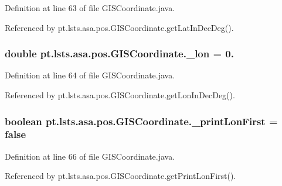 Definition at line 63 of file G\+I\+S\+Coordinate.\+java.



Referenced by pt.\+lsts.\+asa.\+pos.\+G\+I\+S\+Coordinate.\+get\+Lat\+In\+Dec\+Deg().

\hypertarget{classpt_1_1lsts_1_1asa_1_1pos_1_1GISCoordinate_af124301bd53ea68c0b67e9eeb2483c07}{}
\subsubsection[{\+\_\+lon}]{\setlength{\rightskip}{0pt plus 5cm}double pt.\+lsts.\+asa.\+pos.\+G\+I\+S\+Coordinate.\+\_\+lon = 0.\hspace{0.3cm}{\ttfamily [private]}}\label{classpt_1_1lsts_1_1asa_1_1pos_1_1GISCoordinate_af124301bd53ea68c0b67e9eeb2483c07}


Definition at line 64 of file G\+I\+S\+Coordinate.\+java.



Referenced by pt.\+lsts.\+asa.\+pos.\+G\+I\+S\+Coordinate.\+get\+Lon\+In\+Dec\+Deg().

\hypertarget{classpt_1_1lsts_1_1asa_1_1pos_1_1GISCoordinate_af782673ce1b6b2f0031ef307c6488fda}{}
\subsubsection[{\+\_\+print\+Lon\+First}]{\setlength{\rightskip}{0pt plus 5cm}boolean pt.\+lsts.\+asa.\+pos.\+G\+I\+S\+Coordinate.\+\_\+print\+Lon\+First = false\hspace{0.3cm}{\ttfamily [private]}}\label{classpt_1_1lsts_1_1asa_1_1pos_1_1GISCoordinate_af782673ce1b6b2f0031ef307c6488fda}


Definition at line 66 of file G\+I\+S\+Coordinate.\+java.



Referenced by pt.\+lsts.\+asa.\+pos.\+G\+I\+S\+Coordinate.\+get\+Print\+Lon\+First().

